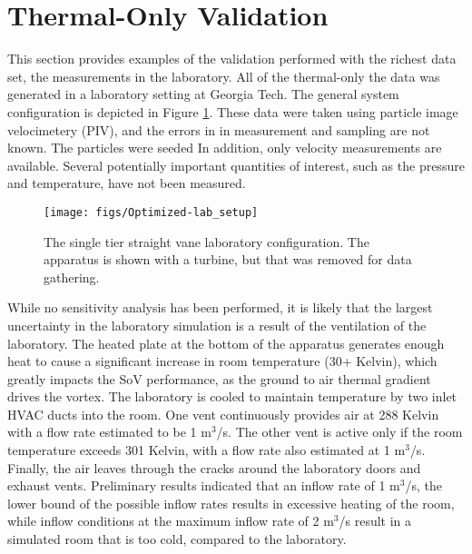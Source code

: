 \section{Thermal-Only Validation}
This section provides examples of the validation performed with the
richest data set, the measurements in the laboratory. All of the
thermal-only the data was generated in a laboratory setting at Georgia
Tech. The general system configuration is depicted in Figure
\ref{fig:lab_image}. These data were taken using particle image
velocimetery (PIV), and the errors in in measurement and sampling are
not known. The particles were seeded
In addition, only velocity measurements are
available. Several potentially important quantities of interest, such as
the pressure and temperature, have not been measured. 

%
%
 \begin{figure}[!htb]
   \begin{center}
    \texttt{[image: figs/Optimized-lab\_setup]}
    \caption{The single tier straight vane laboratory configuration. The
    apparatus is shown with a turbine, but that was removed for data
    gathering.}
    \label{fig:lab_image}
   \end{center}
 \end{figure}

While no sensitivity analysis has been performed, it is likely that the
largest uncertainty in the laboratory simulation is a result of the
ventilation of the laboratory. The heated plate at the bottom of the apparatus
generates enough heat to cause a significant increase in room
temperature (30+ Kelvin), which greatly impacts the SoV
performance, as the ground to air thermal gradient drives the
vortex. The laboratory is cooled to maintain
temperature by two inlet HVAC ducts into the room. 
One vent continuously provides air at 288 Kelvin with a flow rate estimated 
to be 1 $\text{m}^3$/s.
The other vent is active only if the room temperature exceeds 301 Kelvin, 
with a flow rate also estimated at 1 $\text{m}^3$/s.
Finally, the air leaves through the cracks around the laboratory doors and 
exhaust vents. Preliminary results indicated that an inflow rate of 1
$\text{m}^3$/s, the lower bound of the possible inflow rates results in
excessive heating of the room, while inflow conditions at the maximum
inflow rate of 2 $\text{m}^3$/s result in a simulated room that is too cold,
compared to the laboratory.  

